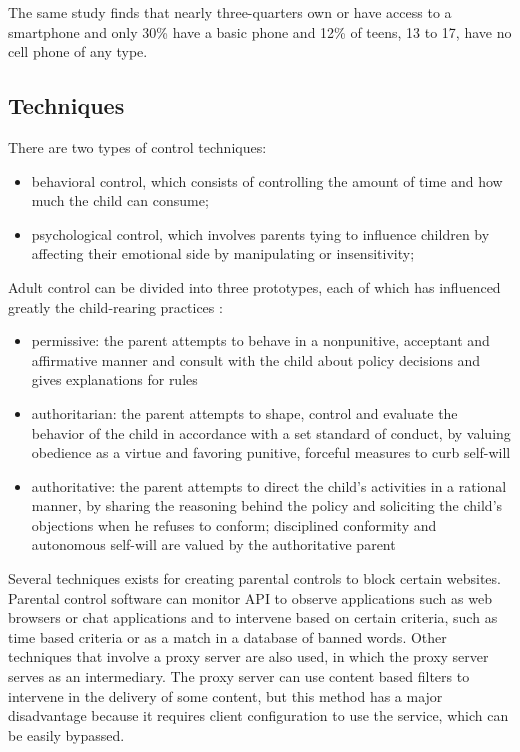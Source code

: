 The same study finds that nearly three-quarters own or have access to a smartphone and only 30\% have a basic phone and 12\% of teens, 13 to 17, have no cell phone of any type.

\subsection{Techniques}

There are two types of control techniques:
\begin{itemize}
\item behavioral control, which consists of controlling the amount of time and how much the child can consume;
\item psychological control, which involves parents tying to influence children by affecting their emotional side by manipulating or insensitivity;
\end{itemize} 

Adult control can be divided into three prototypes, each of which has influenced greatly the child-rearing practices \parencite{baumrind1966effects}:

\begin{itemize}
\item permissive: the parent attempts to behave in a nonpunitive, acceptant and affirmative manner and consult with the child about policy decisions and gives explanations for rules
\item authoritarian: the parent attempts to shape, control and evaluate the behavior of the child in accordance with a set standard of conduct, by valuing obedience as a virtue and favoring punitive, forceful measures to curb self-will
\item authoritative: the parent attempts to direct the child's activities in a rational manner, by sharing the reasoning behind the policy and soliciting the child's objections when he refuses to conform; disciplined conformity and autonomous self-will are valued by the authoritative parent
\end{itemize}

Several techniques exists for creating parental controls to block certain websites. Parental control software can monitor API to observe applications such as web browsers or chat applications and to intervene based on certain criteria, such as time based criteria or as a match in a database of banned words. Other techniques that involve a proxy server are also used, in which the proxy server serves as an intermediary. The proxy server can use content based filters to intervene in the delivery of some content, but this method has a major disadvantage because it requires client configuration to use the service, which can be easily bypassed.

